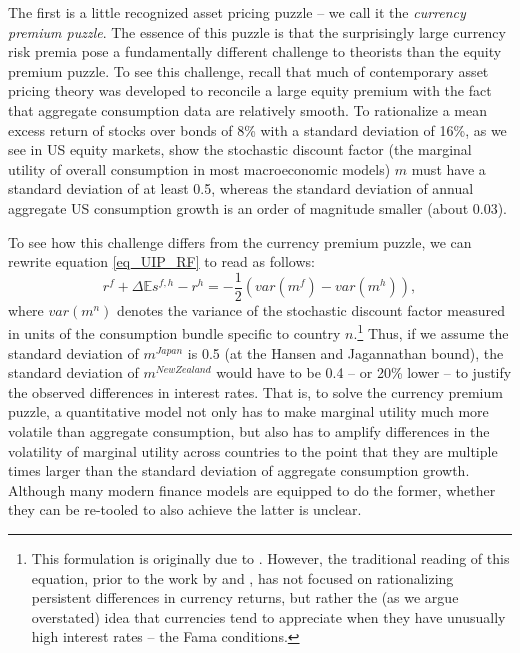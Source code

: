 \documentclass{ar-1col}
\begin{document}
The first is a little recognized asset pricing puzzle -- we call it the \textit{currency premium puzzle}. The essence of this puzzle is that the surprisingly large currency risk premia pose a fundamentally different challenge to theorists than the equity premium puzzle. To see this challenge, recall that much of contemporary asset pricing theory was developed to reconcile a large equity premium with the fact that aggregate consumption data are relatively smooth. To rationalize a mean excess return of stocks over bonds of 8\% with a standard deviation of 16\%, as we see in US equity markets, \citet{HansenJagannathan1991} show the stochastic discount factor (the marginal utility of overall consumption in most macroeconomic models) $m$ must have a standard deviation of at least 0.5, whereas the standard deviation of annual aggregate US consumption growth is an order of magnitude smaller (about 0.03).  

To see how this challenge differs from the currency premium puzzle, we can rewrite equation \ref{eq_UIP_RF} to read as follows: 
\begin{equation}\label{eq_BFT}
  r^{f} + \Delta \mathbb{E} s^{f,h} - r^{h} 
  =-\frac{1}{2}\left(var(m^f)-var(m^h)\right),
\end{equation} 
where $var(m^n)$ denotes the variance of the stochastic discount factor measured in units of the consumption bundle specific to country $n$.\footnote{This formulation is originally due to \cite{Backusetal2001}. However, the traditional reading of this equation, prior to the work by \cite{LustigRoussanovVerdelhan2011} and \cite{HassanMano2019}, has not focused on rationalizing persistent differences in currency returns, but rather the (as we argue overstated) idea that currencies tend to appreciate when they have unusually high interest rates -- the Fama conditions.} Thus, if we assume the standard deviation of $m^{Japan}$ is 0.5 (at the Hansen and Jagannathan bound), the standard deviation of $m^{New Zealand}$ would have to be 0.4 -- or 20\% lower -- to justify the observed differences in interest rates. That is, to solve the currency premium puzzle, a quantitative model not only has to make marginal utility much more volatile than aggregate consumption, but also has to amplify differences in the volatility of marginal utility across countries to the point that they are multiple times larger than the standard deviation of aggregate consumption growth. Although many modern finance models are equipped to do the former, whether they can be re-tooled to also achieve the latter is unclear. 
\end{document}
